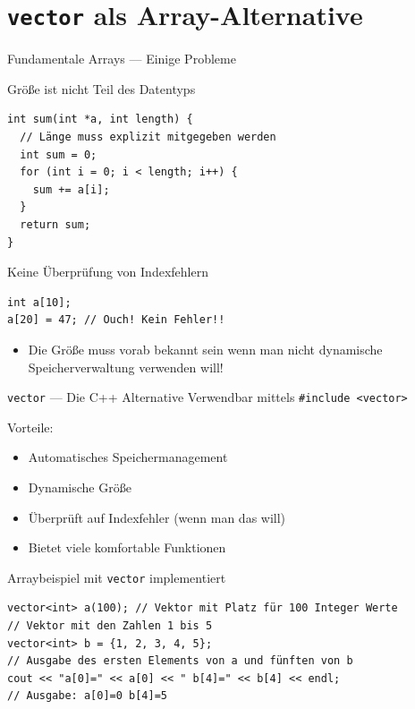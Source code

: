 \documentclass[presentation]{beamer}
\begin{document}
\section{\texttt{vector} als Array-Alternative}
\label{sec:org99c1e23}
\begin{frame}[fragile,label={sec:org71ba744}]{Fundamentale Arrays --- Einige Probleme}
 \begin{block}{Größe ist nicht Teil des Datentyps}
\begin{verbatim}
int sum(int *a, int length) {
  // Länge muss explizit mitgegeben werden
  int sum = 0;
  for (int i = 0; i < length; i++) {
    sum += a[i];
  }
  return sum;
}
\end{verbatim}
\end{block}
\begin{block}{Keine Überprüfung von Indexfehlern}
\begin{verbatim}
int a[10];
a[20] = 47; // Ouch! Kein Fehler!!
\end{verbatim}
\end{block}
\begin{itemize}
\item Die Größe muss vorab bekannt sein wenn man nicht dynamische
Speicherverwaltung verwenden will!
\end{itemize}
\end{frame}
\begin{frame}[fragile,label={sec:org3585a98}]{{\color{solarizedYellow}\texttt{vector} }--- Die C++ Alternative}
 Verwendbar mittels {\color{solarizedYellow}\texttt{\#include <vector>}}

Vorteile:
\begin{itemize}
\item Automatisches Speichermanagement
\item Dynamische Größe
\item Überprüft auf Indexfehler (wenn man das will)
\item Bietet viele komfortable Funktionen
\end{itemize}
\begin{exampleblock}{Arraybeispiel mit {\color{solarizedYellow}\texttt{vector} }implementiert}
\begin{verbatim}
vector<int> a(100); // Vektor mit Platz für 100 Integer Werte
// Vektor mit den Zahlen 1 bis 5
vector<int> b = {1, 2, 3, 4, 5};
// Ausgabe des ersten Elements von a und fünften von b
cout << "a[0]=" << a[0] << " b[4]=" << b[4] << endl;
// Ausgabe: a[0]=0 b[4]=5
\end{verbatim}
\end{exampleblock}
\end{frame}
\end{document}
